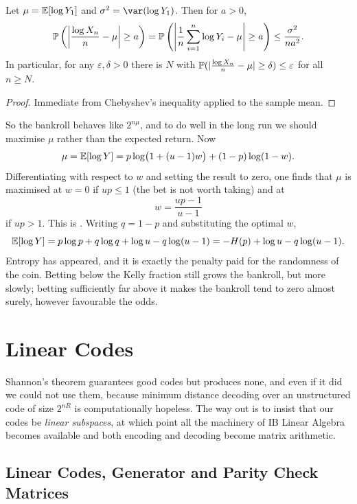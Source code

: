 \documentclass[a4paper]{scrartcl}
\begin{document}
\begin{lemma}
	Let $\mu = \mathbb{E}[\log Y_1]$ and $\sigma^2 = \var(\log Y_1)$. Then for $a>0$,
	$$\mathbb{P}\left(\left\lvert \frac{\log X_n}{n}-\mu\right\rvert \ge a\right) = \mathbb{P}\left(\left\lvert\frac1n\sum_{i=1}^n \log Y_i - \mu\right\rvert\ge a\right) \le \frac{\sigma^2}{na^2}.$$
	In particular, for any $\varepsilon, \delta>0$ there is $N$ with $\mathbb{P}(\lvert\frac{\log X_n}{n}-\mu\rvert\ge\delta)\le\varepsilon$ for all $n\ge N$.
\end{lemma}

\begin{proof}
	Immediate from Chebyshev's inequality applied to the sample mean.
\end{proof}

So the bankroll behaves like $2^{n\mu}$, and to do well in the long run we should maximise $\mu$ rather than the expected return. Now
$$\mu = \mathbb{E}[\log Y] = p\log\bigl(1+(u-1)w\bigr)+(1-p)\log(1-w).$$
Differentiating with respect to $w$ and setting the result to zero, one finds that $\mu$ is maximised at $w = 0$ if $up \le 1$ (the bet is not worth taking) and at
$$w = \frac{up-1}{u-1}$$
if $up>1$. This is . Writing $q = 1-p$ and substituting the optimal $w$,
$$\mathbb{E}[\log Y] = p\log p + q \log q + \log u - q\log(u-1) = -H(p)+\log u - q\log(u-1).$$
Entropy has appeared, and it is exactly the penalty paid for the randomness of the coin. Betting below the Kelly fraction still grows the bankroll, but more slowly; betting sufficiently far above it makes the bankroll tend to zero almost surely, however favourable the odds.


\section{Linear Codes}\label{sec:linear}

Shannon's theorem guarantees good codes but produces none, and even if it did we could not use them, because minimum distance decoding over an unstructured code of size $2^{nR}$ is computationally hopeless. The way out is to insist that our codes be \emph{linear subspaces}, at which point all the machinery of IB Linear Algebra becomes available and both encoding and decoding become matrix arithmetic.

\subsection{Linear Codes, Generator and Parity Check Matrices}
\end{document}
